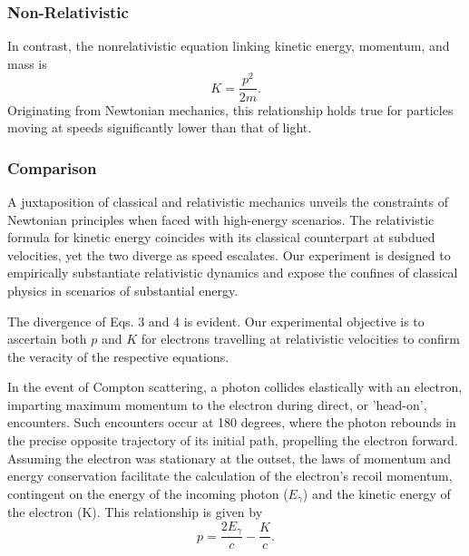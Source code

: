 \documentclass[12pt]{article}
\begin{document}
            
            \subsubsection{Non-Relativistic}                
                    In contrast, the nonrelativistic equation linking kinetic energy, momentum, and mass is
                    \begin{equation}
                    K = \frac{p^2}{2m}.
                    \end{equation}
                    Originating from Newtonian mechanics, this relationship holds true for particles moving at speeds significantly lower than that of light.
            
            \subsubsection{Comparison}
                    A juxtaposition of classical and relativistic mechanics unveils the constraints of Newtonian principles when faced with high-energy scenarios. The relativistic formula for kinetic energy coincides with its classical counterpart at subdued velocities, yet the two diverge as speed escalates. Our experiment is designed to empirically substantiate relativistic dynamics and expose the confines of classical physics in scenarios of substantial energy.

                    The divergence of Eqs. 3 and 4 is evident. Our experimental objective is to ascertain both \( p \) and \( K \) for electrons travelling at relativistic velocities to confirm the veracity of the respective equations.

                    In the event of Compton scattering, a photon collides elastically with an electron, imparting maximum momentum to the electron during direct, or 'head-on', encounters. Such encounters occur at 180 degrees, where the photon rebounds in the precise opposite trajectory of its initial path, propelling the electron forward. Assuming the electron was stationary at the outset, the laws of momentum and energy conservation facilitate the calculation of the electron's recoil momentum, contingent on the energy of the incoming photon (\( E_\gamma \)) and the kinetic energy of the electron (K). This relationship is given by
                    \begin{equation}
                    p = \frac{2E_\gamma}{c} - \frac{K}{c}.
                    \end{equation}
\end{document}
